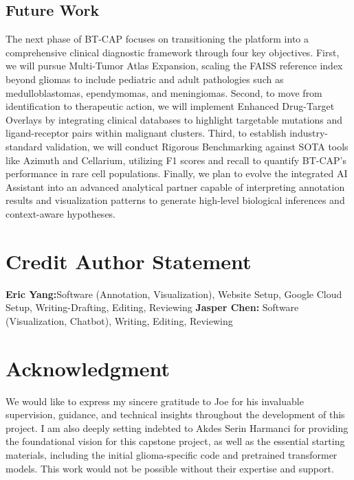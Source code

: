 \documentclass[conference]{IEEEtran}
\begin{document}
\subsection{Future Work}
The next phase of BT-CAP focuses on transitioning the platform into a comprehensive clinical diagnostic framework through four key objectives. First, we will pursue Multi-Tumor Atlas Expansion, scaling the FAISS reference index beyond gliomas to include pediatric and adult pathologies such as medulloblastomas, ependymomas, and meningiomas. Second, to move from identification to therapeutic action, we will implement Enhanced Drug-Target Overlays by integrating clinical databases to highlight targetable mutations and ligand-receptor pairs within malignant clusters. Third, to establish industry-standard validation, we will conduct Rigorous Benchmarking against SOTA tools like Azimuth and Cellarium, utilizing F1 scores and recall to quantify BT-CAP’s performance in rare cell populations. Finally, we plan to evolve the integrated AI Assistant into an advanced analytical partner capable of interpreting annotation results and visualization patterns to generate high-level biological inferences and context-aware hypotheses.

\section{Credit Author Statement}
\textbf{Eric Yang:}Software (Annotation, Visualization), Website Setup, Google Cloud Setup, Writing-Drafting, Editing, Reviewing \textbf{Jasper Chen:} Software (Visualization, Chatbot), Writing, Editing, Reviewing

\section{Acknowledgment}
We would like to express my sincere gratitude to Joe for his invaluable supervision, guidance, and technical insights throughout the development of this project. I am also deeply setting indebted to Akdes Serin Harmanci for providing the foundational vision for this capstone project, as well as the essential starting materials, including the initial glioma-specific code and pretrained transformer models. This work would not be possible without their expertise and support.



\vspace{12pt}
\end{document}
